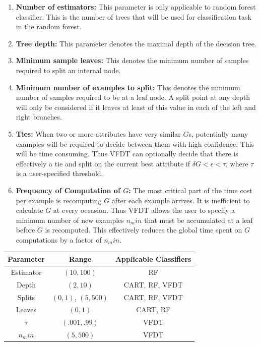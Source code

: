 \documentclass[sigplan]{acmart}\settopmatter{printfolios=true,printccs=false,printacmref=false}
\begin{document}
\begin{enumerate}
	\item \textbf{Number of estimators: } This parameter is only applicable to random forest classifier. This is the number of trees that will be used for classification task in the random forest. 
	\item \textbf{Tree depth: } This parameter denotes the maximal depth of the decision tree.
	\item \textbf{Minimum sample leaves: } This denotes the minimum number of samples required to split an internal node.
	\item \textbf{Minimum number of examples to split: } This denotes the minimum number of samples required to be at a leaf node. A split point at any depth will only be considered if it leaves at least of this value in each of the left and right branches.
	\item \textbf{Ties: } When two or more attributes have very similar $G$s, potentially many examples will be required to decide between them with high confidence. This will be time consuming. Thus VFDT can optionally decide that there is effectively a tie and split on the current best attribute if $\delta G < \epsilon < \tau$, where $\tau$ is a user-specified threshold.
	\item \textbf{Frequency of Computation of $G$: } The most critical part of the time cost per example is recomputing $G$ after each example arrives. It is inefficient to calculate $G$ at every occasion. Thus VFDT allows the user to specify a minimum number of new examples $n_min$ that must be accumulated at a leaf before $G$ is recomputed. This effectively reduces the global time spent on $G$ computations by a factor of $n_min$.
\end{enumerate}

\begin{center}
	\begin{table}[h]
		\begin{tabular}{|c|c|c|}
			\hline 
			\textbf{Parameter} & \textbf{Range} & \textbf{Applicable Classifiers} \\ 
			\hline 
			Estimator & $(10,100)$ & RF \\ 
			\hline 
			Depth & $(2,10)$ & CART, RF, VFDT \\ 
			\hline 
			Splits & $(0,1)$, $(5,500)$ & CART, RF, VFDT \\ 
			\hline 
			Leaves & $(0,1)$ & CART, RF \\ 
			\hline 
			$\tau$ & $(.001,.99)$ & VFDT \\ 
			\hline 
			$n_min$& $(5,500)$ & VFDT \\ 
			\hline 
		\end{tabular} 
	\end{table}
\end{center}
\end{document}
